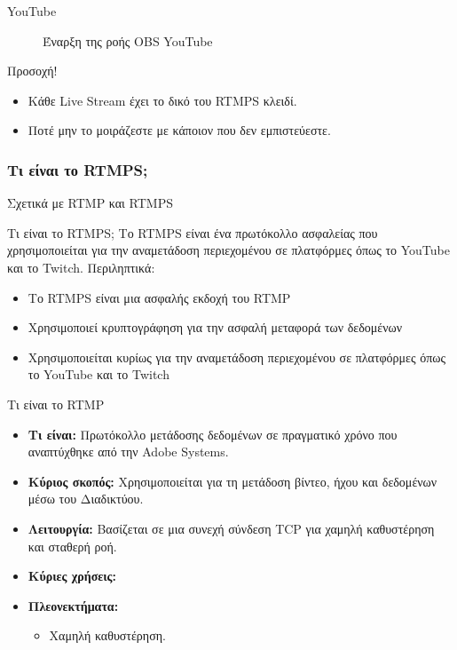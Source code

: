 \documentclass[aspectratio=169]{beamer}
\begin{document}
\begin{frame}[allowframebreaks]{YouTube}
\begin{figure}
    \caption{Έναρξη της ροής OBS \rightarrow YouTube}
    \label{fig:obs2youtube}
  \end{figure}
\begin{alertblock}{Προσοχή!}
  \begin{itemize}
    \item Κάθε Live Stream έχει το δικό του RTMPS κλειδί.
    \item Ποτέ μην το μοιράζεστε με κάποιον που δεν εμπιστεύεστε.
  \end{itemize}
\end{alertblock}
\end{frame}
\subsubsection{Τι είναι το RTMPS;}
\begin{frame}[allowframebreaks]{Σχετικά με RTMP και RTMPS}
  \begin{exampleblock}{Τι είναι το RTMPS;}
    Το RTMPS είναι ένα πρωτόκολλο ασφαλείας που χρησιμοποιείται για την αναμετάδοση περιεχομένου σε πλατφόρμες όπως το YouTube και το Twitch.
    Περιληπτικά:
    \begin{itemize}
      \item Το RTMPS είναι μια ασφαλής εκδοχή του RTMP
      \item Χρησιμοποιεί κρυπτογράφηση για την ασφαλή μεταφορά των δεδομένων
      \item Χρησιμοποιείται κυρίως για την αναμετάδοση περιεχομένου σε πλατφόρμες όπως το YouTube και το Twitch
    \end{itemize}
  \end{exampleblock}
  \begin{exampleblock}{Τι είναι το RTMP}
    \begin{itemize}
      \item \textbf{Τι είναι:} Πρωτόκολλο μετάδοσης δεδομένων σε πραγματικό χρόνο που αναπτύχθηκε από την Adobe Systems.
      \item \textbf{Κύριος σκοπός:} Χρησιμοποιείται για τη μετάδοση βίντεο, ήχου και δεδομένων μέσω του Διαδικτύου.
      \item \textbf{Λειτουργία:} Βασίζεται σε μια συνεχή σύνδεση TCP για χαμηλή καθυστέρηση και σταθερή ροή.
      \item \textbf{Κύριες χρήσεις:}
      \item \textbf{Πλεονεκτήματα:}
          \begin{itemize}
              \item Χαμηλή καθυστέρηση.

\end{itemize}
\end{itemize}
\end{exampleblock}
\end{frame}
\end{document}
